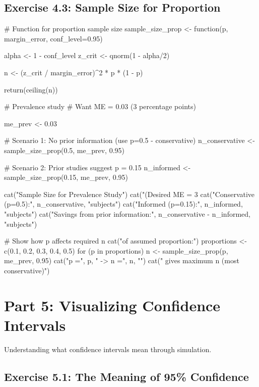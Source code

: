 \documentclass[11pt]{article}
\begin{document}
\subsection{Exercise 4.3: Sample Size for Proportion}

\begin{rcode}
# Function for proportion sample size
sample_size_prop <- function(p, margin_error, conf_level=0.95) {
  alpha <- 1 - conf_level
  z_crit <- qnorm(1 - alpha/2)

  n <- (z_crit / margin_error)^2 * p * (1 - p)

  return(ceiling(n))
}

# Prevalence study
# Want ME = 0.03 (3 percentage points)

me_prev <- 0.03

# Scenario 1: No prior information (use p=0.5 - conservative)
n_conservative <- sample_size_prop(0.5, me_prev, 0.95)

# Scenario 2: Prior studies suggest p = 0.15
n_informed <- sample_size_prop(0.15, me_prev, 0.95)

cat("Sample Size for Prevalence Study\n")
cat("(Desired ME = 3%
cat("Conservative (p=0.5):", n_conservative, "subjects\n")
cat("Informed (p=0.15):", n_informed, "subjects\n\n")
cat("Savings from prior information:", n_conservative - n_informed, "subjects\n")

# Show how p affects required n
cat("\nEffect of assumed proportion:\n")
proportions <- c(0.1, 0.2, 0.3, 0.4, 0.5)
for (p in proportions) {
  n <- sample_size_prop(p, me_prev, 0.95)
  cat("p =", p, " -> n =", n, "\n")
}
cat(" gives maximum n (most conservative)\n")
\end{rcode}

\section{Part 5: Visualizing Confidence Intervals}

Understanding what confidence intervals mean through simulation.

\subsection{Exercise 5.1: The Meaning of 95\% Confidence}
\end{document}
